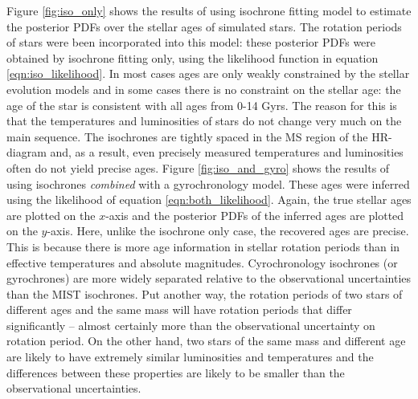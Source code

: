 Figure \ref{fig:iso_only} shows the results of using isochrone fitting
model to estimate the posterior PDFs over the stellar ages of simulated stars.
The rotation periods of stars were been incorporated into this model: these
posterior PDFs were obtained by isochrone fitting only, using the likelihood
function in equation \ref{eqn:iso_likelihood}.
In most cases ages are only weakly constrained by the stellar evolution models
and in some cases there is no constraint on the stellar age: the age of the
star is consistent with all ages from 0-14 Gyrs.
The reason for this is that the temperatures and luminosities of stars do not
change very much on the main sequence.
The isochrones are tightly spaced in the MS region of the HR-diagram and, as a
result, even precisely measured temperatures and luminosities often do not
yield precise ages.
Figure \ref{fig:iso_and_gyro} shows the results of using isochrones {\it
combined} with a gyrochronology model.
These ages were inferred using the likelihood of equation
\ref{eqn:both_likelihood}.
Again, the true stellar ages are plotted on the $x$-axis and the posterior
PDFs of the inferred ages are plotted on the $y$-axis.
Here, unlike the isochrone only case, the recovered ages are precise.
This is because there is more age information in stellar rotation periods than
in effective temperatures and absolute magnitudes.
Cyrochronology isochrones (or gyrochrones) are more widely separated relative
to the observational uncertainties than the MIST isochrones.
Put another way, the rotation periods of two stars of different ages and the
same mass will have rotation periods that differ significantly -- almost
certainly more than the observational uncertainty on rotation period.
On the other hand, two stars of the same mass and different age are likely to
have extremely similar luminosities and temperatures and the differences
between these properties are likely to be smaller than the observational
uncertainties.

